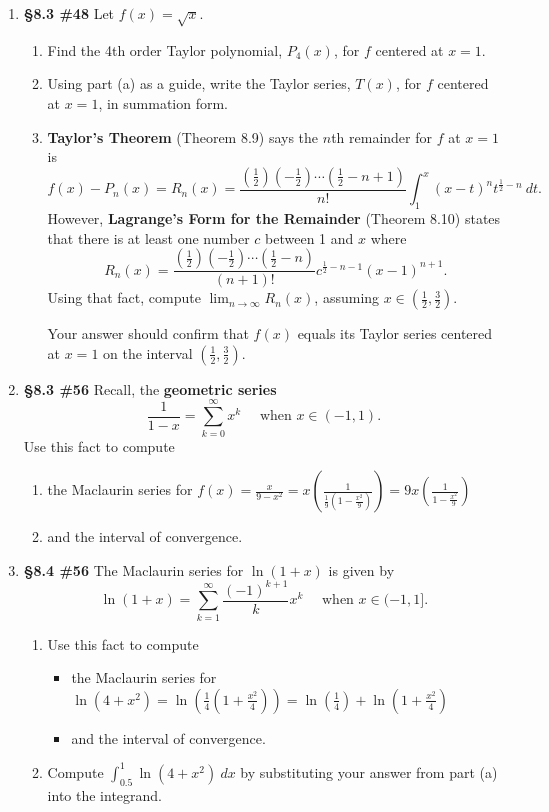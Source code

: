 \documentclass[%
]{article}
\begin{document}
\begin{enumerate}
\item {\bf \S8.3 \#48} Let $f(x)=\sqrt x$.
	\begin{enumerate}
	\item Find the 4th order Taylor polynomial, $P_4(x)$, for $f$ centered at $x=1$.
	\item Using part (a) as a guide, write the Taylor series, $T(x)$, for $f$ centered at $x=1$, in summation form.
	\item \textbf{Taylor's Theorem} (Theorem 8.9) says the $n$th remainder for $f$ at $x=1$ is
	\[
	f(x)-P_n(x)=R_n(x)=\frac{\left(\frac{1}{2}\right)\left(-\frac{1}{2}\right)\cdots \left(\frac{1}{2}-n+1\right)}{n!} \int_1^x(x-t)^nt^{\frac{1}{2}-n}\ dt.
	\]
	However, \textbf{Lagrange's Form for the Remainder} (Theorem 8.10) states that there is at least one number $c$ between 1 and $x$ where 
	\[
	R_n(x)=\frac{\left(\frac{1}{2}\right)\left(-\frac{1}{2}\right)\cdots \left(\frac{1}{2}-n\right)}{(n+1)!}c^{\frac{1}{2}-n-1}(x-1)^{n+1}.
	\]
	Using that fact, compute $\displaystyle\lim_{n\to\infty}R_n(x)$, assuming $x\in\left(\frac{1}{2},\frac{3}{2}\right)$.
	
	\vspace{0.25pc}
	Your answer should confirm that $f(x)$ equals its Taylor series centered at $x=1$ on the interval $\left(\frac{1}{2},\frac{3}{2} \right)$.
	\end{enumerate}

\item {\bf \S8.3 \#56} Recall, the \textbf{geometric series}
\[
\frac{1}{1-x}=\sum_{k=0}^{\infty}x^k\quad \text{ when $x\in(-1,1)$}.
\]
Use this fact to compute
	\begin{enumerate}
	\item the Maclaurin series for 
	$
	f(x)=\frac{x}{9-x^2}=x\left(\frac{1}{\frac{1}{9}\left(1-\frac{x^2}{9}\right)}\right)=9x\left(\frac{1}{1-\frac{x^2}{9}}\right)
	$
	\vspace{-0.7pc}
	\item and the interval of convergence.
	\end{enumerate}
	
\item {\bf \S8.4 \#56} The Maclaurin series for $\ln(1+x)$ is given by
\[
\ln(1+x)=\sum_{k=1}^{\infty}\frac{(-1)^{k+1}}{k}x^k\quad \text{ when $x\in(-1,1]$}.
\]
	\begin{enumerate}
	\item Use this fact to compute
		\begin{itemize}
		\item the Maclaurin series for 
		$
		\ln(4+x^2)=\ln\left(\frac{1}{4}\left(1+\frac{x^2}{4}\right)\right) = \ln\left(\frac{1}{4}\right)+\ln\left(1+\frac{x^2}{4}\right)
		$
		\item and the interval of convergence.
		\end{itemize}
	\item Compute $\displaystyle \int_{0.5}^1\ln(4+x^2)\ dx$ by substituting your answer from part (a) into the integrand.  	
	\end{enumerate}
	
\end{enumerate}
\end{document}

